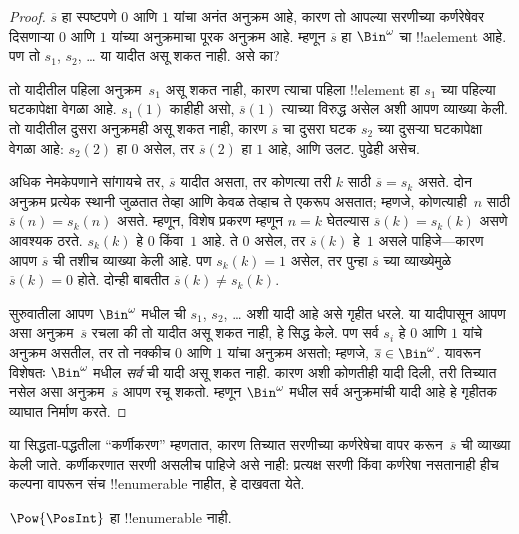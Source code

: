 \documentclass[../../../include/open-logic-section]{subfiles}
\begin{document}
\begin{proof}
$\overline{s}$ हा स्पष्टपणे $0$ आणि $1$ यांचा अनंत अनुक्रम आहे, कारण
तो आपल्या सरणीच्या कर्णरेषेवर दिसणाऱ्या $0$ आणि $1$ यांच्या अनुक्रमाचा
पूरक अनुक्रम आहे. म्हणून $\overline{s}$ हा $\Bin^\omega$ चा
!!a{element} आहे. पण तो $s_1$, $s_2$, \dots{} या यादीत असू शकत नाही.
असे का?

तो यादीतील पहिला अनुक्रम~$s_1$ असू शकत नाही, कारण त्याचा पहिला
!!{element} हा $s_1$ च्या पहिल्या घटकापेक्षा वेगळा आहे. $s_1(1)$
काहीही असो, $\overline{s}(1)$ त्याच्या विरुद्ध असेल अशी आपण व्याख्या
केली. तो यादीतील दुसरा अनुक्रमही असू शकत नाही, कारण $\overline{s}$
चा दुसरा घटक $s_2$ च्या दुसऱ्या घटकापेक्षा वेगळा आहे: $s_2(2)$ हा
$0$ असेल, तर $\overline{s}(2)$ हा $1$ आहे, आणि उलट. पुढेही असेच.

अधिक नेमकेपणाने सांगायचे तर, $\overline{s}$ यादीत असता, तर कोणत्या
तरी $k$ साठी $\overline{s} = s_{k}$ असते. दोन अनुक्रम प्रत्येक स्थानी
जुळतात तेव्हा आणि केवळ तेव्हाच ते एकरूप असतात; म्हणजे, कोणत्याही~$n$
साठी $\overline{s}(n) = s_{k}(n)$ असते. म्हणून, विशेष प्रकरण म्हणून
$n = k$ घेतल्यास $\overline{s}(k) = s_{k}(k)$ असणे आवश्यक ठरते.
$s_k(k)$ हे $0$ किंवा~$1$ आहे. ते $0$ असेल, तर $\overline{s}(k)$ हे~$1$
असले पाहिजे---कारण आपण $\overline{s}$ ची तशीच व्याख्या केली आहे. पण
$s_k(k) = 1$ असेल, तर पुन्हा $\overline{s}$ च्या व्याख्येमुळे
$\overline{s}(k) = 0$ होते. दोन्ही बाबतीत
$\overline{s}(k) \neq s_{k}(k)$.

सुरुवातीला आपण $\Bin^\omega$ मधील ची $s_1$, $s_2$,
\dots{} अशी यादी आहे असे गृहीत धरले. या यादीपासून आपण असा
अनुक्रम~$\overline{s}$ रचला की तो यादीत असू शकत नाही, हे सिद्ध केले.
पण सर्व $s_i$ हे $0$ आणि $1$ यांचे अनुक्रम असतील, तर तो नक्कीच $0$
आणि $1$ यांचा अनुक्रम असतो; म्हणजे, $\overline{s} \in
\Bin^\omega$. यावरून विशेषतः $\Bin^\omega$ मधील \emph{सर्व}
ची यादी असू शकत नाही. कारण अशी कोणतीही यादी दिली, तरी
तिच्यात नसेल असा अनुक्रम~$\overline{s}$ आपण रचू शकतो. म्हणून
$\Bin^\omega$ मधील सर्व अनुक्रमांची यादी आहे हे गृहीतक व्याघात निर्माण
करते.
\end{proof}

\begin{explain}
या सिद्धता-पद्धतीला ``कर्णीकरण'' म्हणतात, कारण तिच्यात सरणीच्या
कर्णरेषेचा वापर करून~$\overline{s}$ ची व्याख्या केली जाते. कर्णीकरणात
सरणी असलीच पाहिजे असे नाही: प्रत्यक्ष सरणी किंवा कर्णरेषा नसतानाही
हीच कल्पना वापरून संच !!{enumerable} नाहीत, हे दाखवता येते.
\end{explain}

\begin{thm}
$\Pow{\PosInt}$ हा !!{enumerable} नाही.
\end{thm}
\end{document}
